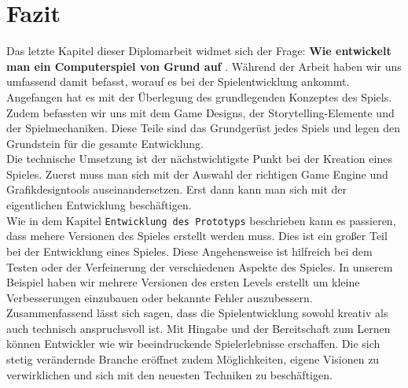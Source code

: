 \pagebreak
{}

\chapter{Fazit}
Das letzte Kapitel dieser Diplomarbeit widmet sich der Frage: \glqq \textbf{Wie entwickelt man ein Computerspiel von Grund auf} \grqq. Während der Arbeit haben wir uns umfassend damit befasst, worauf es bei der Spielentwicklung ankommt. \\

Angefangen hat es mit der Überlegung des grundlegenden Konzeptes des Spiels. Zudem befassten wir uns mit dem Game Designs, der Storytelling-Elemente und der Spielmechaniken. Diese Teile sind das Grundgerüst jedes Spiels und legen den Grundstein für die gesamte Entwicklung.\\

Die technische Umsetzung ist der nächstwichtigste Punkt bei der Kreation eines Spieles. Zuerst muss man sich mit der Auswahl der richtigen Game Engine und Grafikdesigntools auseinandersetzen. Erst dann kann man sich mit der eigentlichen Entwicklung beschäftigen.\\

Wie in dem Kapitel \verb+Entwicklung des Prototyps+ beschrieben kann es passieren, dass mehere Versionen des Spieles erstellt werden muss. Dies ist ein großer Teil bei der Entwicklung eines Spieles. Diese Angehensweise ist hilfreich bei dem Testen oder der Verfeinerung der verschiedenen Aspekte des Spieles. In unserem Beispiel haben wir mehrere Versionen des ersten Levels erstellt um kleine Verbesserungen einzubauen oder bekannte Fehler auszubessern.\\

Zusammenfassend lässt sich sagen, dass die Spielentwicklung sowohl kreativ als auch technisch anspruchsvoll ist. Mit Hingabe und der Bereitschaft zum Lernen können Entwickler wie wir beeindruckende Spielerlebnisse erschaffen. Die sich stetig verändernde Branche eröffnet zudem Möglichkeiten, eigene Visionen zu verwirklichen und sich mit den neuesten Techniken zu beschäftigen.